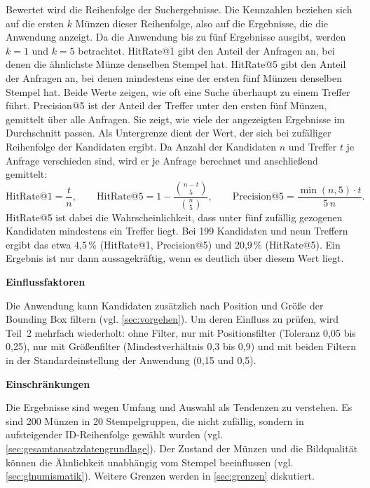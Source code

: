 \noindent Bewertet wird die Reihenfolge der Suchergebnisse. Die Kennzahlen beziehen sich auf die ersten $k$ Münzen dieser Reihenfolge, also auf die Ergebnisse, die die Anwendung anzeigt. Da die Anwendung bis zu fünf Ergebnisse ausgibt, werden $k = 1$ und $k = 5$ betrachtet. HitRate@1 gibt den Anteil der Anfragen an, bei denen die ähnlichste Münze denselben Stempel hat. HitRate@5 gibt den Anteil der Anfragen an, bei denen mindestens eine der ersten fünf Münzen denselben Stempel hat. Beide Werte zeigen, wie oft eine Suche überhaupt zu einem Treffer führt. Precision@5 ist der Anteil der Treffer unter den ersten fünf Münzen, gemittelt über alle Anfragen. Sie zeigt, wie viele der angezeigten Ergebnisse im Durchschnitt passen.
Als Untergrenze dient der Wert, der sich bei zufälliger Reihenfolge der Kandidaten ergibt. Da Anzahl der Kandidaten $n$ und Treffer $t$ je Anfrage verschieden sind, wird er je Anfrage berechnet und anschließend gemittelt:
\[
\text{HitRate@1} = \frac{t}{n}, \qquad
\text{HitRate@5} = 1 - \frac{\binom{n-t}{5}}{\binom{n}{5}}, \qquad
\text{Precision@5} = \frac{\min(n,5)\cdot t}{5\,n}.
\]
HitRate@5 ist dabei die Wahrscheinlichkeit, dass unter fünf zufällig gezogenen Kandidaten mindestens ein Treffer liegt. Bei 199 Kandidaten und neun Treffern ergibt das etwa 4,5\,\% (HitRate@1, Precision@5) und 20,9\,\% (HitRate@5). Ein Ergebnis ist nur dann aussagekräftig, wenn es deutlich über diesem Wert liegt.


\vspace{\baselineskip}

\noindent \textbf{Einflussfaktoren}

\noindent Die Anwendung kann Kandidaten zusätzlich nach Position und Größe der Bounding Box filtern (vgl. \cref{sec:vorgehen}). Um deren Einfluss zu prüfen, wird Teil~2 mehrfach wiederholt: ohne Filter, nur mit Positionsfilter (Toleranz 0,05 bis 0,25), nur mit Größenfilter (Mindestverhältnis 0,3 bis 0,9) und mit beiden Filtern in der Standardeinstellung der Anwendung (0,15 und 0,5).

\vspace{\baselineskip}

\noindent \textbf{Einschränkungen}

\noindent Die Ergebnisse sind wegen Umfang und Auswahl als Tendenzen zu verstehen. Es sind 200 Münzen in 20 Stempelgruppen, die nicht zufällig, sondern in aufsteigender ID-Reihenfolge gewählt wurden (vgl. \cref{sec:gesamtansatzdatengrundlage}). Der Zustand der Münzen und die Bildqualität können die Ähnlichkeit unabhängig vom Stempel beeinflussen (vgl. \cref{sec:glnumismatik}). Weitere Grenzen werden in \cref{sec:grenzen} diskutiert.

